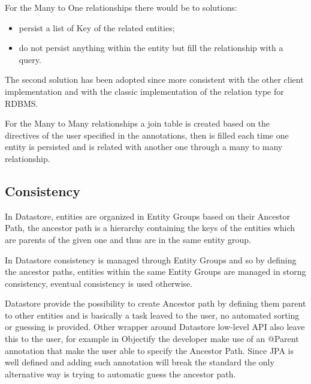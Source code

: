 For the Many to One relationships there would be to solutions:
\begin{itemize}
\item persist a list of Key of the related entities;
\item do not persist anything within the entity but fill the relationship with a query.
\end{itemize}
The second solution has been adopted since more consistent with the other client implementation and with the classic implementation of the relation type for RDBMS.

For the Many to Many relationships a join table is created based on the directives of the user specified in the annotations, then is filled each time one entity is persisted and is related with another one through a many to many relationship.

\subsection{Consistency}
In Datastore, entities are organized in Entity Groups based on their Ancestor Path, the ancestor path is a hierarchy containing the keys of the entities which are parents of the given one and thus are in the same entity group.

In Datastore consistency is managed through Entity Groups and so by defining the ancestor paths, entities within the same Entity Groups are managed in storng consistency, eventual consistency is used otherwise.

Datastore provide the possibility to create Ancestor path by defining them parent to other entities and is basically a task leaved to the user, no automated sorting or guessing is provided. Other wrapper around Datastore low-level API also leave this to the user, for example in Objectify the developer make use of an @Parent annotation that make the user able to specify the Ancestor Path.
Since JPA is well defined and adding such annotation will break the standard the only alternative way is trying to automatic guess the ancestor path.

